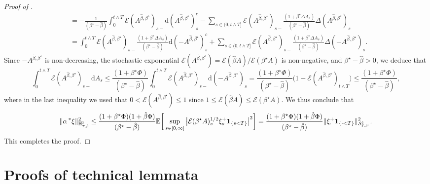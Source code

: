\documentclass[10pt]{article} %
\newcommand\cE{\mathcal E}
\newcommand\cS{\mathcal S}
\newcommand{\smalltext}[1]{\text{\fontsize{4}{4}\selectfont$#1$}}
\def \E{\mathbb{E}}
\def \H{\mathbb{H}}
\newcommand{\brs}[1]{\prescript{\ast}{}{#1}}
\newcommand{\1}{\mathbf{1}}
\def\d{\mathrm{d}}
\begin{document}
\begin{proof}[Proof of ]
\begin{align*}
		&= -\frac{1}{(\beta^\star-\hat\beta)}\int_0^{t \land T}\cE(A^{\hat\beta,\beta^\star})_{s-}\d (A^{\hat\beta,\beta^\star})^c_s - \sum_{s \in (0,t \land T]}\cE(A^{\hat\beta,\beta^\star})_{s-} \frac{(1+\beta^\star \Delta A_s)}{(\beta^\star-\hat\beta)} \Delta (A^{\hat\beta,\beta^\star})_s \\
		&= \int_0^{t \land T}\cE(A^{\hat\beta,\beta^\star})_{s-}\frac{(1+\beta^\star\Delta A_s)}{(\beta^\star-\hat\beta)}\d (-A^{\hat\beta,\beta^\star})^c_s + \sum_{s \in (0,t \land T]}\cE(A^{\hat\beta,\beta^\star})_{s-} \frac{(1+\beta^\star \Delta A_s)}{(\beta^\star-\hat\beta)} \Delta (-A^{\hat\beta,\beta^\star})_s.
	\end{align*}
	Since $-A^{\hat\beta,\beta^\star}$ is non-decreasing, the stochastic exponential $\cE(A^{\hat\beta,\beta^\star}) = \cE(\hat\beta A)/\cE(\beta^\star A)$ is non-negative, and $\beta^\star - \hat\beta > 0$, we deduce that
	\begin{equation*}
		\int_0^{t \land T}\cE(A^{\hat\beta,\beta^\star})_{s-}\d A_s \leq \frac{(1+\beta^\star \Phi)}{(\beta^\star-\hat\beta)} \int_0^{t \land T} \cE(A^{\hat\beta,\beta^\star})_{s-}\d (-A^{\hat\beta,\beta^\star})_s = \frac{(1+\beta^\star \Phi)}{(\beta^\star-\hat\beta)} \bigg(1- \cE(A^{\hat\beta,\beta^\star})_{t \land T}\bigg) \leq \frac{(1+\beta^\star \Phi)}{(\beta^\star-\hat\beta)},
	\end{equation*}
	where in the last inequality we used that $0 < \cE(A^{\hat\beta,\beta^\star}) \leq 1$ since $1 \leq \cE(\hat\beta A) \leq \cE(\beta^\star A)$. We thus conclude that
	\begin{equation*}
		\|\alpha \brs{\xi}\|_{\H^\smalltext{2}_{\smalltext{T}\smalltext{,}\smalltext{\hat\beta}}}^2 
		\leq \frac{(1+\beta^\star \Phi)(1+\hat\beta \Phi)}{(\beta^\star-\hat\beta)}\E\bigg[\sup_{s \in [0,\infty]}\big|\cE(\beta^\star A)^{1/2}_s\xi^+_s\mathbf{1}_{\{s < T\}}\big|^2\bigg] 
		= \frac{(1+\beta^\star \Phi)(1+\hat\beta \Phi)}{(\beta^\star-\hat\beta)}\|\xi^+_\cdot \mathbf{1}_{\{\cdot < T\}}\|^2_{\cS^\smalltext{2}_{\smalltext{T}\smalltext{,}\smalltext{\beta^\star}}}.
	\end{equation*}
	This completes the proof.
\end{proof}

\section{Proofs of technical lemmata}\label{app::proofs_sec_main_results}\label{sec::optimal_stopping_proofs_technical}
\end{document}
